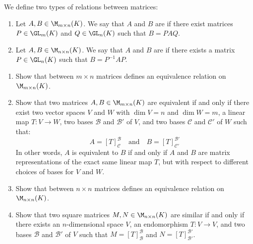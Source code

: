 \begin{definition}
\label{def:equivalence_and_similarity}
We define two types of relations between matrices:
\begin{enumerate}
    \item Let $A, B \in \M_{m \times n}(K)$. We say that $A$ and $B$ are  if there exist matrices $P \in \GL_m(K)$ and $Q \in \GL_n(K)$ such that $B = P A Q$.
    \item Let $A, B \in \M_{n \times n}(K)$. We say that $A$ and $B$ are  if there exists a matrix $P \in \GL_n(K)$ such that $B = P^{-1} A P$.
\end{enumerate}
\end{definition}

\begin{exercise}
\label{exc:equivalence_similarity_properties}
\begin{enumerate}[label=\textbf{(\alph*)}]
    \item Show that  between $m \times n$ matrices defines an equivalence relation on $\M_{m \times n}(K)$.
    \item Show that two matrices $A, B \in \M_{m \times n}(K)$ are equivalent if and only if there exist two vector spaces $V$ and $W$ with $\dim V = n$ and $\dim W = m$, a linear map $T \colon V \to W$, two bases $\mathcal{B}$ and $\mathcal{B}'$ of $V$, and two bases $\mathcal{C}$ and $\mathcal{C}'$ of $W$ such that:
    \begin{equation*}
        A = [T]_{\mathcal{C}}^{\mathcal{B}} \quad \text{and} \quad B = [T]_{\mathcal{C}'}^{\mathcal{B}'}
    \end{equation*}
    In other words, $A$ is equivalent to $B$ if and only if $A$ and $B$ are matrix representations of the exact same linear map $T$, but with respect to different choices of bases for $V$ and $W$.
    \item Show that  between $n \times n$ matrices defines an equivalence relation on $\M_{n \times n}(K)$.
    \item Show that two square matrices $M, N \in \M_{n \times n}(K)$ are similar if and only if there exists an $n$-di\-men\-sional space $V$, an endomorphism $T: V \to V$, and two bases $\mathcal{B}$ and $\mathcal{B}'$ of $V$ such that $M = [T]_{\mathcal{B}}^{\mathcal{B}}$ and $N = [T]_{\mathcal{B}'}^{\mathcal{B}'}$.
\end{enumerate}
\end{exercise}

